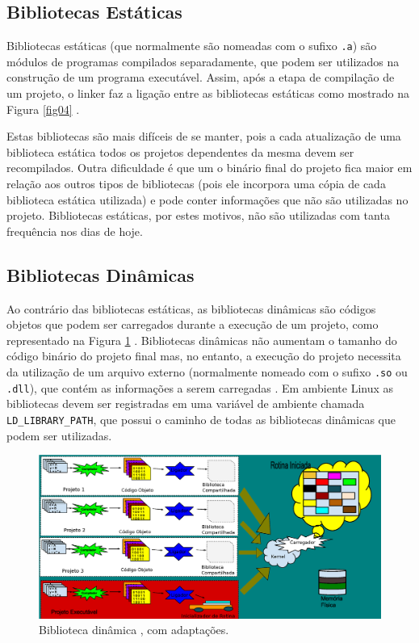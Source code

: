 \subsection{Bibliotecas Estáticas}

Bibliotecas estáticas (que normalmente  são nomeadas com o  sufixo \texttt{.a}) 
são módulos de programas compilados separadamente, que podem ser utilizados
 na construção de um programa executável. Assim, após a etapa de compilação de
 um projeto, o linker faz a ligação entre as bibliotecas estáticas como
 mostrado na Figura \ref{fig04} \cite[pág. 54]{ref39}.

Estas bibliotecas são mais difíceis de se manter, pois a cada atualização de uma
 biblioteca estática todos os projetos dependentes da mesma devem ser recompilados.
 Outra dificuldade é que um o binário final do projeto fica maior em relação aos
 outros tipos de bibliotecas (pois ele incorpora uma cópia de cada biblioteca
 estática utilizada) e pode conter informações que não são utilizadas no projeto.
 Bibliotecas estáticas, por estes motivos, não são utilizadas com tanta
 frequência nos dias de hoje.


\subsection{Bibliotecas Dinâmicas}

Ao contrário das bibliotecas estáticas, as bibliotecas dinâmicas são códigos
 objetos que podem ser carregados durante a execução de um projeto, como
 representado na Figura \ref{fig06} \cite[pág. 57]{ref39}. Bibliotecas dinâmicas 
não aumentam o tamanho do código binário do projeto final mas, no entanto,
 a execução do projeto necessita da utilização de um arquivo externo
 (normalmente nomeado com o sufixo \texttt{.so} ou \texttt{.dll}), que contém as
 informações a serem carregadas \cite{Lasca2}. Em ambiente Linux as
 bibliotecas devem ser  registradas em uma variável de ambiente chamada
 \texttt{LD\_LIBRARY\_PATH}, que possui o caminho de todas as bibliotecas dinâmicas
 que podem ser utilizadas.

\begin{figure}[h]
    \centering
        \includegraphics[keepaspectratio=true,scale=0.45]{figuras/dynamic_lib.eps}
    \caption{Biblioteca dinâmica \cite[pág. 55]{ref39}, com adaptações.}
    \label{fig06}
\end{figure}


